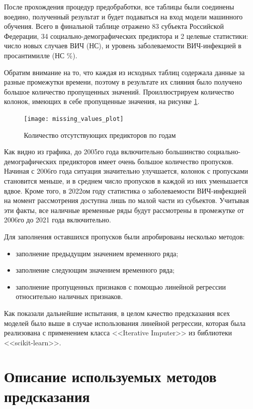 После прохождения процедур предобработки, все таблицы были соединены воедино, полученный результат и будет подаваться на вход модели машинного обучения. Всего в финальной таблице отражено 83 субъекта Российской Федерации, 34 социально-демографических предиктора и 2 целевые статистики: число новых случаев ВИЧ (НС), и уровень заболеваемости ВИЧ-инфекцией в просантимилле (НС \%).

Обратим внимание на то, что каждая из исходных таблиц содержала данные за разные промежутки времени, поэтому в результате их слияния было получено большое количество пропущенных значений. Проиллюстрируем количество колонок, имеющих в себе пропущенные значения, на рисунке \ref{fig:f4_missing}.
\newpage
\begin{figure}[ht]
	\centering
	\texttt{[image: missing\_values\_plot]}
	\caption{Количество отсутствующих предикторов по годам}
	\label{fig:f4_missing}
\end{figure}


Как видно из графика, до 2005го года включительно большинство социально-демографических предикторов имеет очень большое количество пропусков. Начиная с 2006го года ситуация значительно улучшается, колонок с пропусками становится меньше, и в среднем число пропусков в каждой из них уменьшается вдвое. Кроме того, в 2022ом году статистика о заболеваемости ВИЧ-инфекцией на момент рассмотрения доступна лишь по малой части из субъектов. Учитывая эти факты, все наличные временные ряды будут рассмотрены в промежутке от 2006го до 2021 года включительно.

Для заполнения оставшихся пропусков были апробированы несколько методов:
\begin{itemize}
	\item заполнение предыдущим значением временного ряда;
	\item заполнение следующим значением временного ряда;
	\item заполнение пропущенных признаков с помощью линейной регрессии относительно наличных признаков.

\end{itemize}
 
 Как показали дальнейшие испытания, в целом качество предсказания всех моделей было выше в случае использования линейной регрессии, которая была реализована с применением класса <<Iterative Imputer>> из библиотеки <<scikit-learn>>.
 
\section{Описание используемых методов предсказания}

